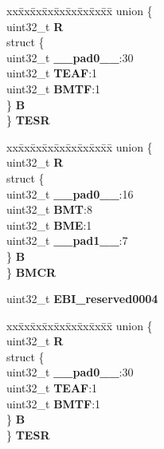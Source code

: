 \begin{DoxyCompactItemize}
\begin{tabbing}
\end{tabbing}\item 
\mbox{\label{structEBI__tag_acd8d80595f43a71d4bc5566a2984ac99}} 
\begin{tabbing}
xx\=xx\=xx\=xx\=xx\=xx\=xx\=xx\=xx\=\kill
union \{\\
\>uint32\_t {\bfseries R}\\
\>struct \{\\
\>\>uint32\_t {\bfseries \_\_pad0\_\_}:30\\
\>\>uint32\_t {\bfseries TEAF}:1\\
\>\>uint32\_t {\bfseries BMTF}:1\\
\>\} {\bfseries B}\\
\} {\bfseries TESR}\\

\end{tabbing}\item 
\mbox{\label{structEBI__tag_ad507351f92f81898cb9d0eeb6bfc71ab}} 
\begin{tabbing}
xx\=xx\=xx\=xx\=xx\=xx\=xx\=xx\=xx\=\kill
union \{\\
\>uint32\_t {\bfseries R}\\
\>struct \{\\
\>\>uint32\_t {\bfseries \_\_pad0\_\_}:16\\
\>\>uint32\_t {\bfseries BMT}:8\\
\>\>uint32\_t {\bfseries BME}:1\\
\>\>uint32\_t {\bfseries \_\_pad1\_\_}:7\\
\>\} {\bfseries B}\\
\} {\bfseries BMCR}\\

\end{tabbing}\item 
\mbox{\label{structEBI__tag_a7f8caac01b1dc165e8050e494f12b3bd}} 
uint32\+\_\+t {\bfseries E\+B\+I\+\_\+reserved0004}
\item 
\mbox{\label{structEBI__tag_a8cd1ea7d8beb9f2cd7e20bd5ce419240}} 
\begin{tabbing}
xx\=xx\=xx\=xx\=xx\=xx\=xx\=xx\=xx\=\kill
union \{\\
\>uint32\_t {\bfseries R}\\
\>struct \{\\
\>\>uint32\_t {\bfseries \_\_pad0\_\_}:30\\
\>\>uint32\_t {\bfseries TEAF}:1\\
\>\>uint32\_t {\bfseries BMTF}:1\\
\>\} {\bfseries B}\\
\} {\bfseries TESR}\\


\end{tabbing}
\end{DoxyCompactItemize}
